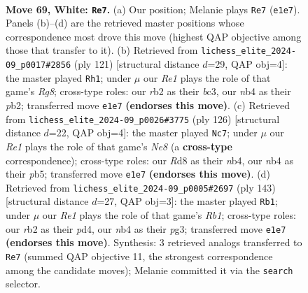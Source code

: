 \documentclass[11pt]{article}
\begin{document}
\clearpage

\begin{figure}[p]\centering
\begin{subfigure}{0.46\textwidth}\centering
\resizebox{\linewidth}{!}{%
\newchessgame
\chessboard[
  setfen={3R4/1p5p/1k4pP/5p2/pn3P2/6K1/1r6/4R3 w - - 2 69},
  showmover=false,
  pgfstyle=straightmove, color=movearrow, markmove={e1-e7}
]}
\caption{}
\end{subfigure}\hfill
\begin{subfigure}{0.46\textwidth}\centering
\resizebox{\linewidth}{!}{%
\newchessgame
\chessboard[
  setfen={8/5k2/6p1/1p6/5K1P/P1B2P1P/1P6/6r1 b - - 27 61},
  showmover=false,
  pgfstyle=straightmove, color=movearrow, markmove={g1-h1}
]}
\caption{}
\end{subfigure}
\\[4pt]
\begin{subfigure}{0.46\textwidth}\centering
\resizebox{\linewidth}{!}{%
\newchessgame
\chessboard[
  setfen={4N3/8/7p/1p2k1pP/1n2p1p1/8/5P2/5K2 w - - 0 64},
  showmover=false,
  pgfstyle=straightmove, color=movearrow, markmove={e8-c7}
]}
\caption{}
\end{subfigure}\hfill
\begin{subfigure}{0.46\textwidth}\centering
\resizebox{\linewidth}{!}{%
\newchessgame
\chessboard[
  setfen={1r6/5p2/3k2p1/7p/2PP3P/2K2PP1/R7/8 b - - 2 72},
  showmover=false,
  pgfstyle=straightmove, color=movearrow, markmove={b8-b1}
]}
\caption{}
\end{subfigure}
\caption{\textbf{Move 69, White: \texttt{Re7}.} (a) Our position; Melanie plays \texttt{Re7} (\texttt{e1e7}). Panels (b)--(d) are the retrieved master positions whose correspondence most drove this move (highest QAP objective among those that transfer to it). (b) Retrieved from \texttt{lichess\_elite\_2024-09\_p0017\#2856} (ply 121) [structural distance $d$=29, QAP obj=4]: the master played \texttt{Rh1}; under $\mu$ our \emph{Re1} plays the role of that game's \emph{Rg8}; cross-type roles: our \emph{r}b2 as their \emph{b}c3, our \emph{n}b4 as their \emph{p}b2; transferred move \texttt{e1e7} \textbf{(endorses this move)}. (c) Retrieved from \texttt{lichess\_elite\_2024-09\_p0026\#3775} (ply 126) [structural distance $d$=22, QAP obj=4]: the master played \texttt{Nc7}; under $\mu$ our \emph{Re1} plays the role of that game's \emph{Ne8} (a \textbf{cross-type} correspondence); cross-type roles: our \emph{R}d8 as their \emph{n}b4, our \emph{n}b4 as their \emph{p}b5; transferred move \texttt{e1e7} \textbf{(endorses this move)}. (d) Retrieved from \texttt{lichess\_elite\_2024-09\_p0005\#2697} (ply 143) [structural distance $d$=27, QAP obj=3]: the master played \texttt{Rb1}; under $\mu$ our \emph{Re1} plays the role of that game's \emph{Rb1}; cross-type roles: our \emph{r}b2 as their \emph{p}d4, our \emph{n}b4 as their \emph{p}g3; transferred move \texttt{e1e7} \textbf{(endorses this move)}. Synthesis: 3 retrieved analogs transferred to \texttt{Re7} (summed QAP objective 11, the strongest correspondence among the candidate moves); Melanie committed it via the \texttt{search} selector.}
\label{fig:thought-m136}
\end{figure}
\end{document}
